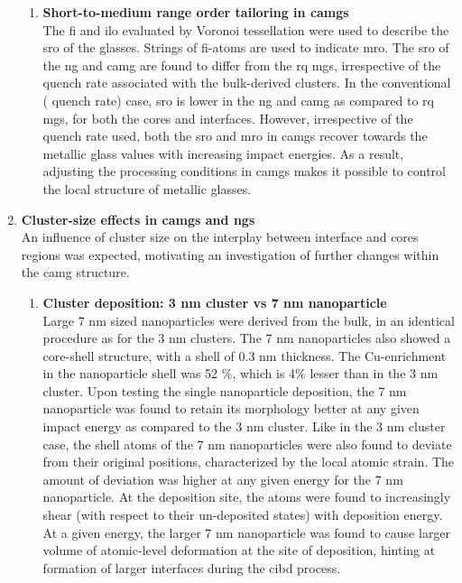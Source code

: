 \begin{enumerate}[leftmargin=*]
\begin{enumerate}[leftmargin=*]
\item \textbf{Short-to-medium range order tailoring in \cz \gls{camg}s}\\
The \gls{fi} and \gls{ilo} evaluated by Voronoi tessellation were used to describe the \gls{sro} of the glasses. Strings of \gls{fi}-atoms are used to indicate \gls{mro}. The \gls{sro} of the \gls{ng} and \gls{camg} are found to differ from the \gls{rq} \gls{mg}s, irrespective of the quench rate associated with the bulk-derived clusters. In the conventional ( quench rate) case, \gls{sro} is lower in the \gls{ng} and \gls{camg} as compared to \gls{rq} \gls{mg}s, for both the cores and interfaces. However, irrespective of the quench rate used, both the \gls{sro} and \gls{mro} in \gls{camg}s recover towards the metallic glass values with increasing impact energies. As a result, adjusting the processing conditions in \gls{camg}s makes it possible to control the local structure of metallic glasses.
\end{enumerate}

\item \textbf{Cluster-size effects in \gls{camg}s and \gls{ng}s}\\
An influence of cluster size on the interplay between interface and cores regions was expected, motivating an investigation of further changes within the \gls{camg} structure.

\begin{enumerate}[leftmargin=*]
\item \textbf{Cluster deposition: 3 nm cluster vs 7 nm \cz nanoparticle}\\
Large 7 nm sized \cz nanoparticles were derived from the bulk, in an identical procedure as for the 3 nm clusters. The 7 nm nanoparticles also showed a core-shell structure, with a shell of 0.3 nm thickness. The Cu-enrichment in the nanoparticle shell was 52 \%, which is 4\% lesser than in the 3 nm cluster. Upon testing the single nanoparticle deposition, the 7 nm nanoparticle was found to retain its morphology better at any given impact energy as compared to the 3 nm cluster. Like in the 3 nm cluster case, the shell atoms of the 7 nm nanoparticles were also found to deviate from their original positions, characterized by the local atomic strain. The amount of deviation was higher at any given energy for the 7 nm nanoparticle. At the deposition site, the atoms were found to increasingly shear (with respect to their un-deposited states) with deposition energy.
At a given energy, the larger 7 nm nanoparticle was found to cause larger volume of atomic-level deformation at the site of deposition, hinting at formation of larger interfaces during the \gls{cibd} process. \par


\end{enumerate}
\end{enumerate}
